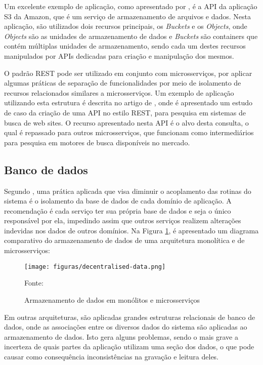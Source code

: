 Um excelente exemplo de aplicação, como apresentado por
, é a \ac{API} da aplicação S3 da Amazon, que é
um serviço de armazenamento de arquivos e dados. Nesta aplicação, são
utilizados dois recursos principais, os \emph{Buckets} e os \emph{Objects},
onde \emph{Objects} são as unidades de armazenamento de dados e \emph{Buckets}
são containers que contém múltiplas unidades de armazenamento, sendo cada
um destes recursos manipulados por \acp{API} dedicadas para criação e
manipulação dos mesmos.

O padrão \ac{REST} pode ser utilizado em conjunto com microsserviços, por
aplicar algumas práticas de separação de funcionalidades por meio de
isolamento de recursos relacionados similares a microsserviços. Um exemplo
de aplicação utilizando esta estrutura é descrita no artigo de
, onde é apresentado um estudo de caso da criação
de uma \ac{API} no estilo \ac{REST}, para pesquisa em sistemas de busca de
web sites. O recurso apresentado nesta \ac{API} é o alvo desta consulta,
o qual é repassado para outros microsserviços, que funcionam como
intermediários para pesquisa em motores de busca disponíveis no mercado.

\subsection{Banco de dados}

Segundo , uma prática aplicada que visa diminuir o
acoplamento das rotinas do sistema é o isolamento da base de dados de cada
domínio de aplicação. A recomendação é cada serviço ter sua própria base de
dados e seja o único responsável por ela, impedindo assim que outros serviços
realizem alterações indevidas nos dados de outros domínios. Na Figura
\ref{fig:db-monolith-microservices}, é apresentado um diagrama comparativo do
armazenamento de dados de uma arquitetura monolítica e de microsserviços:

\begin{figure}[H]
	\centering
	\caption{Armazenamento de dados em monólitos e microsserviços}
	\texttt{[image: figuras/decentralised-data.png]}

	\label{fig:db-monolith-microservices}
	\footnotesize Fonte: 
\end{figure}

Em outras arquiteturas, são aplicadas grandes estruturas relacionais de banco
de dados, onde as associações entre os diversos dados do sistema são
aplicadas ao armazenamento de dados. Isto gera alguns problemas, sendo o mais
grave a incerteza de quais partes da aplicação utilizam uma seção dos dados,
o que pode causar como consequência inconsistências na gravação e leitura
deles.

